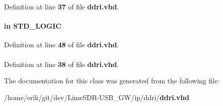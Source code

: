 Definition at line {\bf 37} of file {\bf ddri.\+vhd}.

\paragraph[{inclock}]{ {\bfseries \textcolor{keywordflow}{in}\textcolor{vhdlchar}{ }} {\bfseries \textcolor{comment}{S\+T\+D\+\_\+\+L\+O\+G\+IC}\textcolor{vhdlchar}{ }} \hspace{0.3cm}{\ttfamily [Port]}}\label{classddri_a4182c262d5f0c8da39fddbe85c168b63}


Definition at line {\bf 48} of file {\bf ddri.\+vhd}.

\paragraph[{std\+\_\+logic\+\_\+1164}]{\hspace{0.3cm}{\ttfamily [Package]}}\label{classddri_acd03516902501cd1c7296a98e22c6fcb}


Definition at line {\bf 38} of file {\bf ddri.\+vhd}.



The documentation for this class was generated from the following file\+:\begin{DoxyCompactItemize}
\item 
/home/erik/git/dev/\+Lime\+S\+D\+R-\/\+U\+S\+B\+\_\+\+G\+W/ip/ddri/{\bf ddri.\+vhd}\end{DoxyCompactItemize}
